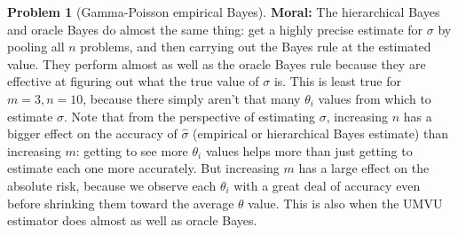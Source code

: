 \documentclass{article}
\theoremstyle{definition}
\newtheorem{problem}{Problem}
\begin{document}
\begin{problem}[Gamma-Poisson empirical Bayes]
{\bf Moral:} The hierarchical Bayes and oracle Bayes do almost the same thing: get a highly precise estimate for $\sigma$ by pooling all $n$ problems, and then carrying out the Bayes rule at the estimated value. They perform almost as well as the oracle Bayes rule because they are effective at figuring out what the true value of $\sigma$ is. This is least true for $m=3,n=10$, because there simply aren't that many $\theta_i$ values from which to estimate $\sigma$. Note that from the perspective of estimating $\sigma$, increasing $n$ has a bigger effect on the accuracy of $\hat\sigma$ (empirical or hierarchical Bayes estimate) than increasing $m$: getting to see more $\theta_i$ values helps more than just getting to estimate each one more accurately. But increasing $m$ has a large effect on the absolute risk, because we observe each $\theta_i$ with a great deal of accuracy even before shrinking them toward the average $\theta$ value. This is also when the UMVU estimator does almost as well as oracle Bayes.
\end{problem}
\end{document}
